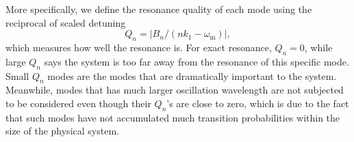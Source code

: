 \documentclass[%
reprint,
 amsmath,amssymb,
 aps,
]{revtex4-1}
\begin{document}

More specifically, we define the resonance quality of each mode using the reciprocal of scaled detuning 
　\begin{equation}
　Q_n = \lvert B_n/( n k_1 - \omega_{\mathrm{m}}  )\rvert,
　\end{equation}
which measures how well the resonance is. For exact resonance, $Q_n=0$, while large $Q_n$ says the system is too far away from the resonance of this specific mode. Small $Q_n$ modes are the modes that are dramatically important to the system. Meanwhile, modes that has much larger oscillation wavelength are not subjected to be considered even though their $Q_n$'s are close to zero, which is due to the fact that such modes have not accumulated much transition probabilities within the size of the physical system.









\end{document}
